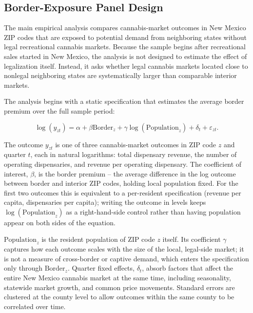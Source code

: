 \documentclass[12pt]{article}
\begin{document}
\subsection{Border-Exposure Panel Design}
\label{sec:borderexposure}

The main empirical analysis compares cannabis-market outcomes in New Mexico ZIP codes that are exposed to potential demand from neighboring states without legal recreational cannabis markets. Because the sample begins after recreational sales started in New Mexico, the analysis is not designed to estimate the effect of legalization itself. Instead, it asks whether legal cannabis markets located close to nonlegal neighboring states are systematically larger than comparable interior markets.

The analysis begins with a static specification that estimates the average border premium over the full sample period:

\begin{equation}
\label{baseline}
\log(y_{zt})=\alpha
+
\beta \text{Border}_z
+
\gamma \log(\text{Population}_z)
+
\delta_t
+
\varepsilon_{zt}.
\end{equation}

The outcome \(y_{zt}\) is one of three cannabis-market outcomes in ZIP code \(z\) and quarter \(t\), each in natural logarithms: total dispensary revenue, the number of operating dispensaries, and revenue per operating dispensary. The coefficient of interest, \(\beta\), is the border premium -- the average difference in the log outcome between border and interior ZIP codes, holding local population fixed. For the first two outcomes this is equivalent to a per-resident specification (revenue per capita, dispensaries per capita); writing the outcome in levels keeps \(\log(\text{Population}_z)\) as a right-hand-side control rather than having population appear on both sides of the equation.

\(\text{Population}_z\) is the resident population of ZIP code \(z\) itself. Its coefficient \(\gamma\) captures how each outcome scales with the size of the local, legal-side market; it is not a measure of cross-border or captive demand, which enters the specification only through \(\text{Border}_z\). Quarter fixed effects, \(\delta_t\), absorb factors that affect the entire New Mexico cannabis market at the same time, including seasonality, statewide market growth, and common price movements. Standard errors are clustered at the county level to allow outcomes within the same county to be correlated over time.
\end{document}

